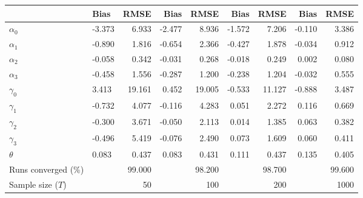 
\begin{tabular}[t]{llrrrrrrr}
\toprule
  & Bias & RMSE & Bias & RMSE & Bias & RMSE & Bias & RMSE\\
\midrule
$\alpha_{0}$ & -3.373 & 6.933 & -2.477 & 8.936 & -1.572 & 7.206 & -0.110 & 3.386\\
$\alpha_{1}$ & -0.890 & 1.816 & -0.654 & 2.366 & -0.427 & 1.878 & -0.034 & 0.912\\
$\alpha_{2}$ & -0.058 & 0.342 & -0.031 & 0.268 & -0.018 & 0.249 & 0.002 & 0.080\\
$\alpha_{3}$ & -0.458 & 1.556 & -0.287 & 1.200 & -0.238 & 1.204 & -0.032 & 0.555\\
$\gamma_{0}$ & 3.413 & 19.161 & 0.452 & 19.005 & -0.533 & 11.127 & -0.888 & 3.487\\
$\gamma_{1}$ & -0.732 & 4.077 & -0.116 & 4.283 & 0.051 & 2.272 & 0.116 & 0.669\\
$\gamma_{2}$ & -0.300 & 3.671 & -0.050 & 2.113 & 0.014 & 1.385 & 0.063 & 0.382\\
$\gamma_{3}$ & -0.496 & 5.419 & -0.076 & 2.490 & 0.073 & 1.609 & 0.060 & 0.411\\
$\theta$ & 0.083 & 0.437 & 0.083 & 0.431 & 0.111 & 0.437 & 0.135 & 0.405\\
Runs converged (\%) &  & 99.000 &  & 98.200 &  & 98.700 &  & 99.600\\
Sample size ($T$) &  & 50 &  & 100 &  & 200 &  & 1000\\
\bottomrule
\end{tabular}
